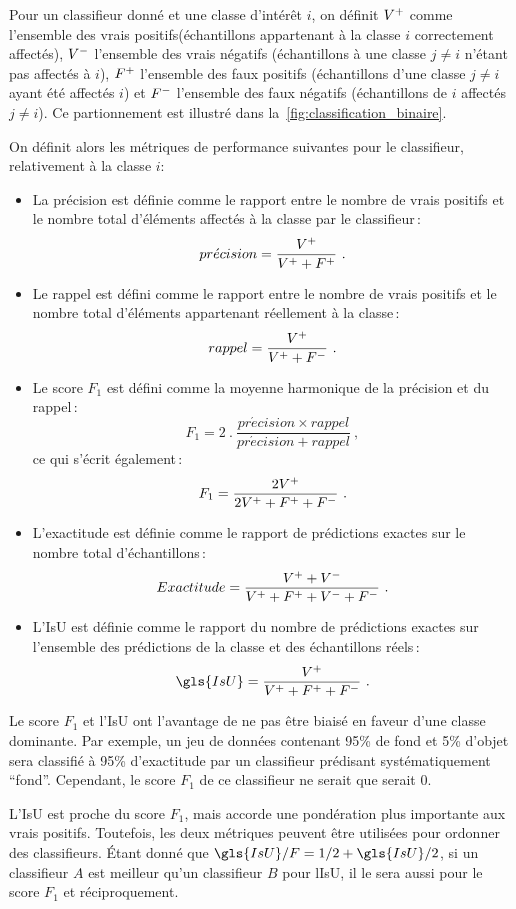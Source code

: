 Pour un classifieur donné et une classe d'intérêt $i$, on définit $V^+$ comme l'ensemble des vrais positifs(échantillons appartenant à la classe $i$ correctement affectés), $V^-$ l'ensemble des vrais négatifs (échantillons à une classe $j \neq i$ n'étant pas affectés à $i$), $F^+$ l'ensemble des faux positifs (échantillons d'une classe $j \neq i$ ayant été affectés $i$) et $F^-$ l'ensemble des faux négatifs (échantillons de $i$ affectés $j \neq i$). Ce partionnement est illustré dans la~\cref{fig:classification_binaire}.

On définit alors les métriques de performance suivantes pour le classifieur, relativement à la classe $i$:
\begin{itemize}
	\item La précision est définie comme le rapport entre le nombre de vrais positifs et le nombre total d'éléments affectés à la classe par le classifieur\,:
  $$pr\acute{e}cision = \frac{V^+}{V^+ + F^+}~.$$
	\item Le rappel est défini comme le rapport entre le nombre de vrais positifs et le nombre total d'éléments appartenant réellement à la classe\,:
  $$rappel = \frac{V^+}{V^+ + F^-}~.$$
	\item Le score $F_1$ est défini comme la moyenne harmonique de la précision et du rappel\,:
  $$F_1 = 2~.~\frac{pr\acute{e}cision \times rappel}{pr\acute{e}cision + rappel}~,$$
  ce qui s'écrit également\,:
  $$F_1 = \frac{2 V^+}{2 V^+ + F^+ + F^-}~.$$
	\item L'exactitude est définie comme le rapport de prédictions exactes sur le nombre total d'échantillons\,:
  $$Exactitude = \frac{V^+ + V^-}{V^+ + F^+ + V^- + F^-}~.$$
	\item L'\gls{IsU} est définie comme le rapport du nombre de prédictions exactes sur l'ensemble des prédictions de la classe et des échantillons réels\,:
  $$\gls{IsU} = \frac{\tp}{\tp + \fp + \fn}~.$$
\end{itemize}

Le score $F_1$ et l'\gls{IsU} ont l'avantage de ne pas être biaisé en faveur d'une classe dominante. Par exemple, un jeu de données contenant 95\% de fond et 5\% d'objet sera classifié à 95\% d'exactitude par un classifieur prédisant systématiquement ``fond''. Cependant, le score $F_1$ de ce classifieur ne serait que serait $0$.

L'\gls{IsU} est proche du score $F_1$, mais accorde une pondération plus importante aux vrais positifs. Toutefois, les deux métriques peuvent être utilisées pour ordonner des classifieurs. Étant donné que $\gls{IsU}/F = 1/2 + \gls{IsU}/2$, si un classifieur $A$ est meilleur qu'un classifieur $B$ pour l\gls{IsU}, il le sera aussi pour le score $F_1$ et réciproquement.

